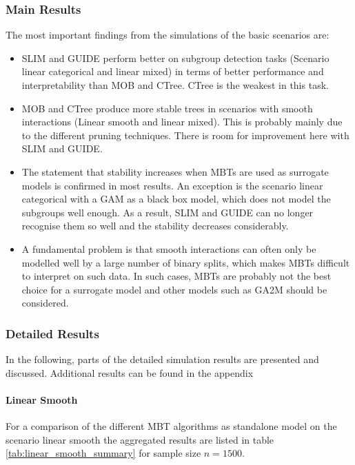 \subsubsection{Main Results}
The most important findings from the simulations of the basic scenarios are:
\begin{itemize}
    \item SLIM and GUIDE perform better on subgroup detection tasks (Scenario linear categorical and linear mixed) in terms of better performance and interpretability than MOB and CTree. CTree is the weakest in this task.
    \item MOB and CTree produce more stable trees in scenarios with smooth interactions (Linear smooth and linear mixed). This is probably mainly due to the different pruning techniques. There is room for improvement here with SLIM and GUIDE.
    \item The statement that stability increases when MBTs are used as surrogate models is confirmed in most results. An exception is the scenario linear categorical with a GAM as a black box model, which does not model the subgroups well enough. As a result, SLIM and GUIDE can no longer recognise them so well and the stability decreases considerably.
    \item A fundamental problem is that smooth interactions can often only be modelled well by a large number of binary splits, which makes MBTs difficult to interpret on such data. In such cases, MBTs are probably not the best choice for a surrogate model and other models such as GA2M should be considered.

\end{itemize}


\subsubsection{Detailed Results}
In the following, parts of the detailed simulation results are presented and discussed. Additional results can be found in the appendix

\paragraph{Linear Smooth}
For a comparison of the different MBT algorithms as standalone model on the scenario linear smooth the aggregated results are listed in table \ref{tab:linear_smooth_summary} for sample size $n = 1500$. 

